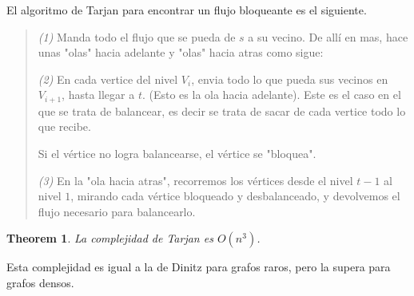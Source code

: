 \documentclass[a4paper]{article}
\newtheorem{theorem}{Theorem}
\newtheorem{theorem}{Theorem}
\begin{document}
El algoritmo de Tarjan para encontrar un flujo bloqueante es el siguiente.

\small
\begin{quote}

\textit{(1)} Manda todo el flujo que se pueda de $s$ a su vecino. De allí en
mas, hace unas "olas" hacia adelante y "olas" hacia atras como sigue:

\textit{(2)} En cada vertice del nivel $V_i$, envia todo lo que pueda sus
vecinos en $V_{i+1}$, hasta llegar a $t$. (Esto es la ola hacia adelante).
Este es el caso en el que se trata de balancear, es decir se trata
de sacar de cada vertice todo lo que recibe.

Si el vértice no logra balancearse, el vértice se "bloquea".

\textit{(3)} En la "ola hacia atras", recorremos los vértices desde el nivel $t
- 1$ al nivel $1$, mirando cada vértice bloqueado y desbalanceado, y 
devolvemos el flujo necesario para balancearlo.

\end{quote}
\normalsize

\begin{theorem}
    La complejidad de Tarjan es $O(n^3)$.
\end{theorem}

Esta complejidad es igual a la de Dinitz para grafos raros, pero la supera para
grafos densos.
\end{document}
